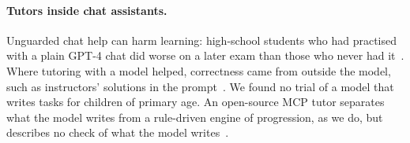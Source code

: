 \paragraph{Tutors inside chat assistants.} Unguarded chat help can harm learning: high-school students who had practised with a plain GPT-4 chat did worse on a later exam than those who never had it~\cite{bastani2025generative}. Where tutoring with a model helped, correctness came from outside the model, such as instructors' solutions in the prompt~\cite{kestin2025ai}. We found no trial of a model that writes tasks for children of primary age. An open-source MCP tutor separates what the model writes from a rule-driven engine of progression, as we do, but describes no check of what the model writes~\cite{guiovanna2026tutor}.
